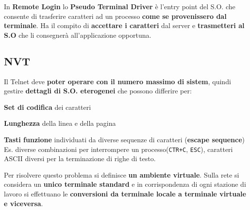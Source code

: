 \documentclass[10pt]{article}
\begin{document}
In \textbf{Remote Login} lo \textbf{Pseudo Terminal Driver} è l'entry point del S.O. che consente di trasferire caratteri ad un processo \textbf{come se provenissero dal terminale}. Ha il compito di \textbf{accettare i caratteri} dal server e \textbf{trasmetteri al S.O} che li consegnerà all'applicazione opportuna.
\subsection{NVT}
Il Telnet deve \textbf{poter operare con il numero massimo di sistem}, quindi gestire \textbf{dettagli di S.O. eterogenei} che possono differire per:
\begin{list}{}{}
\item \textbf{Set di codifica} dei caratteri
\item \textbf{Lunghezza} della linea e della pagina
\item \textbf{Tasti funzione} individuati da diverse sequenze di caratteri (\textbf{escape sequence})\\
Es. diverse combinazioni per interrompere un processo(\texttt{CTR+C}, \texttt{ESC}), caratteri ASCII diversi per la terminazione di righe di testo.
\end{list}
Per risolvere questo problema si definisce \textbf{un ambiente virtuale}. Sulla rete si considera un \textbf{unico terminale standard} e in corrispondenza di ogni stazione di lavoro si effettuano le \textbf{conversioni da terminale locale a terminale virtuale e viceversa}.
\end{document}
